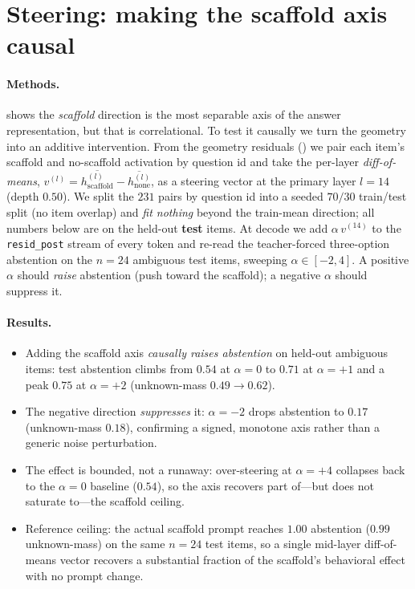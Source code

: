 \section{Steering: making the scaffold axis causal}
\label{app:steer}

\paragraph{Methods.}
 shows the \emph{scaffold} direction is the most separable axis
of the answer representation, but that is correlational. To test it causally we
turn the geometry into an additive intervention. From the geometry residuals
() we pair each item's scaffold and no-scaffold activation by
question id and take the per-layer \emph{diff-of-means}, $v^{(l)} =
\overline{h^{(l)}_{\text{scaffold}}} - \overline{h^{(l)}_{\text{none}}}$, as a
steering vector at the primary layer $l{=}14$ (depth $0.50$). We split the
$231$ pairs by question id into a seeded $70/30$ train/test split (no item
overlap) and \emph{fit nothing} beyond the train-mean direction; all numbers below
are on the held-out \textbf{test} items. At decode we add $\alpha\,v^{(14)}$ to the
\texttt{resid\_post} stream of every token and re-read the teacher-forced
three-option abstention on the $n{=}24$ ambiguous test items, sweeping
$\alpha \in [-2, 4]$. A positive $\alpha$ should \emph{raise} abstention (push
toward the scaffold); a negative $\alpha$ should suppress it.

\paragraph{Results.}
\begin{itemize}[leftmargin=*,topsep=2pt,itemsep=1pt]
  \item Adding the scaffold axis \emph{causally raises abstention} on held-out
    ambiguous items: test abstention climbs from $0.54$ at $\alpha{=}0$ to $0.71$
    at $\alpha{=}{+}1$ and a peak $0.75$ at $\alpha{=}{+}2$ (unknown-mass
    $0.49 \to 0.62$).
  \item The negative direction \emph{suppresses} it: $\alpha{=}{-}2$ drops
    abstention to $0.17$ (unknown-mass $0.18$), confirming a signed, monotone axis
    rather than a generic noise perturbation.
  \item The effect is bounded, not a runaway: over-steering at $\alpha{=}{+}4$
    collapses back to the $\alpha{=}0$ baseline ($0.54$), so the axis recovers part
    of---but does not saturate to---the scaffold ceiling.
  \item Reference ceiling: the actual scaffold prompt reaches $1.00$ abstention
    ($0.99$ unknown-mass) on the same $n{=}24$ test items, so a single mid-layer
    diff-of-means vector recovers a substantial fraction of the scaffold's
    behavioral effect with no prompt change.
\end{itemize}


